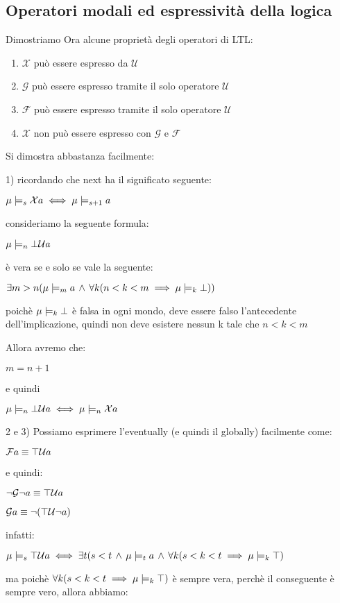 \subsection{Operatori modali ed espressività della logica}

Dimostriamo Ora alcune proprietà degli operatori di LTL:
\begin{enumerate}
\item $\mathcal{X}$ può essere espresso da $\mathcal{U}$ 
\item $\mathcal{G}$ può essere espresso tramite il solo operatore  $\mathcal{U}$ 
\item $\mathcal{F}$ può essere espresso tramite il solo operatore $\mathcal{U}$ 
\item $\mathcal{X}$ non può essere espresso con $\mathcal{G}$ e $\mathcal{F}$ 
\end{enumerate}
Si dimostra abbastanza facilmente:

1) ricordando che next ha il significato seguente:

$\mu\models_{s}\mathcal{X}a\iff\mu\models_{s+1}a$

consideriamo la seguente formula:

$\mu\models_{n}\bot\mathcal{U}a$

è vera se e solo se vale la seguente:

$\exists m>n(\mu\models_{m}a\,\wedge\,\forall k(n<k<m\implies\mu\models_{k}\bot))$

poichè $\mu\models_{k}\bot$ è falsa in ogni mondo, deve essere falso
l'antecedente dell'implicazione, quindi non deve esistere nessun k
tale che $n<k<m$

Allora avremo che:

$m=n+1$

e quindi

$\mu\models_{n}\bot\mathcal{U}a\iff\mu\models_{n}\mathcal{X}a$

2 e 3) Possiamo esprimere l'eventually (e quindi il globally) facilmente
come:

$\mathcal{F}a\equiv\top\mathcal{U}a$

e quindi:

$\neg\mathcal{G}\neg a\equiv\top\mathcal{U}a$

$\mathcal{G}a\equiv\neg(\top\mathcal{U}\neg a)$

infatti:

$\mu\models_{s}\top\mathcal{U}a\iff\exists t(s<t\,\wedge\,\mu\models_{t}a\,\wedge\,\forall k(s<k<t\implies\mu\models_{k}\top)$

ma poichè $\forall k(s<k<t\implies\mu\models_{k}\top)$ è sempre vera,
perchè il conseguente è sempre vero, allora abbiamo:

